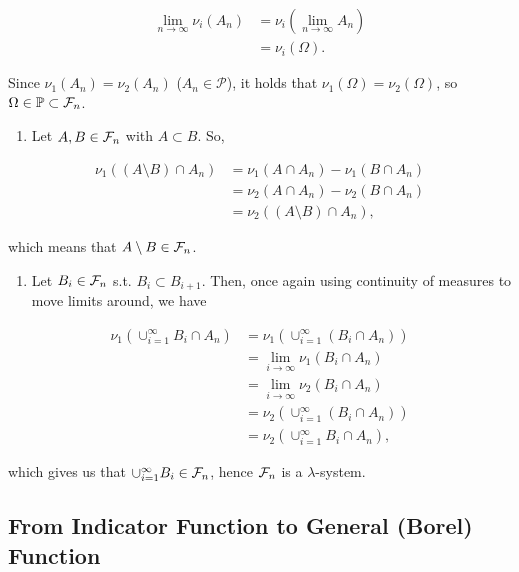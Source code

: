 \documentclass[]{book}
\providecommand{\tightlist}{%
  \setlength{\itemsep}{0pt}\setlength{\parskip}{0pt}}
\theoremstyle{definition}
\theoremstyle{definition}
\theoremstyle{definition}
\theoremstyle{remark}
\begin{document}
\begin{align*}
  \lim_{n \rightarrow \infty} \nu_i(A_n) &= \nu_i(\lim_{n \rightarrow \infty} A_n) \\
    &= \nu_i(\Omega).
\end{align*}

Since \(\nu_1(A_n) = \nu_2(A_n)\) (\(A_n \in \mathcal{P}\)), it holds
that \(\nu_1(\Omega) = \nu_2(\Omega)\), so
\(\Omega \in \mathbb{P} \subset \mathcal{F}_n\).

\begin{enumerate}
\def\labelenumi{\roman{enumi})}
\setcounter{enumi}{1}
\tightlist
\item
  Let \(A,B \in \mathcal{F}_n\) with \(A \subset B\). So,
\end{enumerate}

\begin{align*}
  \nu_1((A\setminus B) \cap A_n) &= \nu_1(A\cap A_n) - \nu_1(B\cap A_n) \\
    &= \nu_2(A\cap A_n) - \nu_2(B\cap A_n) \\
    &= \nu_2((A\setminus B) \cap A_n),
\end{align*}

which means that \(A\setminus B \in \mathcal{F}_n\).

\begin{enumerate}
\def\labelenumi{\roman{enumi})}
\setcounter{enumi}{2}
\tightlist
\item
  Let \(B_i \in \mathcal{F}_n\) s.t. \(B_i \subset B_{i+1}\). Then, once again
  using continuity of measures to move limits around, we have
\end{enumerate}

\begin{align}
  \nu_1\left(\cup_{i=1}^\infty B_i \cap A_n \right) &= \nu_1\left(\cup_{i=1}^\infty (B_i \cap A_n) \right) \\
    &= \lim_{i \rightarrow \infty} \nu_1(B_i \cap A_n) \\
    &= \lim_{i \rightarrow \infty} \nu_2(B_i \cap A_n) \\
    &= \nu_2\left(\cup_{i=1}^\infty (B_i \cap A_n) \right) \\
    &= \nu_2\left(\cup_{i=1}^\infty B_i \cap A_n \right),
\end{align}

which gives us that \(\cup_{i = 1}^\infty B_i \in \mathcal{F}_n\), hence \(\mathcal{F}_n\)
is a \(\lambda\)-system.

\subsection{From Indicator Function to General (Borel)
Function}\label{from-indicator-function-to-general-borel-function}
\end{document}
